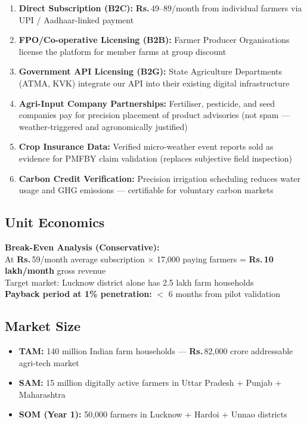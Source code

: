 \documentclass[12pt,a4paper]{article}
\newcommand{\Rup}{\textbf{Rs.\,}}
\begin{document}
\begin{enumerate}[leftmargin=*]
  \item \textbf{Direct Subscription (B2C):} \Rup 49--89/month from individual farmers via UPI / Aadhaar-linked payment
  \item \textbf{FPO/Co-operative Licensing (B2B):} Farmer Producer Organisations license the platform for member farms at group discount
  \item \textbf{Government API Licensing (B2G):} State Agriculture Departments (ATMA, KVK) integrate our API into their existing digital infrastructure
  \item \textbf{Agri-Input Company Partnerships:} Fertiliser, pesticide, and seed companies pay for precision placement of product advisories (not spam --- weather-triggered and agronomically justified)
  \item \textbf{Crop Insurance Data:} Verified micro-weather event reports sold as evidence for PMFBY claim validation (replaces subjective field inspection)
  \item \textbf{Carbon Credit Verification:} Precision irrigation scheduling reduces water usage and GHG emissions --- certifiable for voluntary carbon markets
\end{enumerate}

\subsection{Unit Economics}

\begin{statbox}
\textbf{Break-Even Analysis (Conservative):}\\
At \Rup 59/month average subscription $\times$ 17,000 paying farmers = \textbf{\Rup 10 lakh/month} gross revenue \\
Target market: Lucknow district alone has 2.5 lakh farm households \\
\textbf{Payback period at 1\% penetration:} $<$ 6 months from pilot validation
\end{statbox}

\subsection{Market Size}

\begin{itemize}[leftmargin=*]
  \item \textbf{TAM:} 140 million Indian farm households --- \Rup 82,000 crore addressable agri-tech market
  \item \textbf{SAM:} 15 million digitally active farmers in Uttar Pradesh + Punjab + Maharashtra
  \item \textbf{SOM (Year 1):} 50,000 farmers in Lucknow + Hardoi + Unnao districts
\end{itemize}
\end{document}
